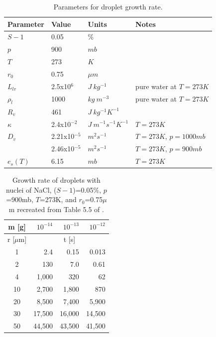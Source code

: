 \documentclass[]{article}
\newcommand{\ra}[1]{\renewcommand{\arraystretch}{#1}}
\begin{document}
\begin{table}[h]
    \centering
    \caption{Parameters for droplet growth rate.}
    \label{tab:parameters}

    \begin{tabular}{l l l l}
    \toprule
    Parameter & Value & Units & Notes\\
    \midrule
    $S - 1$   & 0.05            & \%                         & \\
    $p$       & 900             & $mb$                       & \\
    $T$       & 273             & $K$                        & \\
    $r_0$     & 0.75            & $\mu m$                    & \\
    $L_{lv}$  & 2.5x10$^{6}$    & $J \ kg^{-1}$              & pure water at $T=273 K$ \\
    $\rho_l$  & 1000            & $kg \ m^{-3}$              & pure water at $T=273 K$ \\
    $R_v$     & 461             & $J \ kg^{-1} K^{-1}$       & \\
    $\kappa$  & 2.4x10$^{-2}$   & $J \ m^{-1} s^{-1} K^{-1}$ & $T=273 K$ \\
    $D_v$     & 2.21x10$^{-5}$  & $m^2 s^{-1}$               & $T=273 K$, $p=1000 mb$ \\
              & 2.46x10$^{-5}$  & $m^2 s^{-1}$               & $T=273 K$, $p=900 mb$ \\
    $e_s (T)$ & 6.15            & $mb$                       & $T=273 K$\\
    \bottomrule
    \end{tabular}
\end{table}


\begin{table}[h]
    \centering
    \caption{Growth rate of droplets with nuclei of NaCl, ($S - 1$)=0.05\%,
        $p$=900mb, $T$=273K, and $r_0$=0.75$\mu$m recreated from Table 5.5 of \cite{Curry}.}
    \label{tab:Table5.5}

    \ra{1.2}
    \begin{tabular}{@{} c r r r @{}}
        \\
        \toprule
        m [g] & $10^{-14}$ & $10^{-13}$ & $10^{-12}$ \\
        \midrule
        r [$\mu$m] & \multicolumn{3}{c}{t [s]} \\
        \midrule
        1  & 2.4    & 0.15   & 0.013 \\
        2  & 130    & 7.0    & 0.61 \\
        4  & 1,000  & 320    & 62 \\
        10 & 2,700  & 1,800  & 870 \\
        20 & 8,500  & 7,400  & 5,900 \\
        30 & 17,500 & 16,000 & 14,500 \\
        50 & 44,500 & 43,500 & 41,500 \\
        \bottomrule
    \end{tabular}
\end{table}
\end{document}
